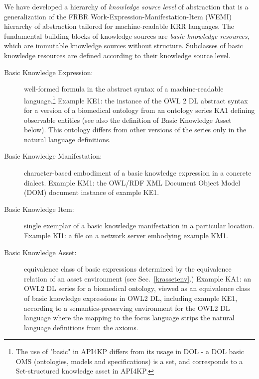 \documentclass[runningheads]{llncs}
\begin{document}
We have developed a hierarchy of \emph{knowledge source level} of abstraction that is a generalization of the FRBR \cite{FRBR} Work-Expression-Manifestation-Item (WEMI) hierarchy of abstraction tailored for machine-readable KRR languages. The fundamental building blocks of knowledge sources are \emph{basic knowledge resources}, which are immutable knowledge sources without structure.
Subclasses of basic knowledge resources are defined according to their knowledge source level. 
\begin{description}
\item[Basic Knowledge Expression:] well-formed formula in the abstract syntax of a machine-readable language.\footnote{The use of "basic" in API4KP differs from its usage in DOL - a DOL basic OMS  (ontologies, models and specifications) is a set, and corresponds to a Set-structured knowledge asset in API4KP.}
Example KE1: the instance of the OWL 2 DL abstract syntax for a version of a biomedical ontology from an ontology series KA1 
defining observable entities
(see also the definition of Basic Knowledge Asset below). 
This ontology differs from other versions of the series only in the natural language definitions.
\item[Basic Knowledge Manifestation:] character-based embodiment of a basic knowledge expression in a concrete dialect. Example KM1: the OWL/RDF XML Document Object Model (DOM) document instance of example KE1.
\item[Basic Knowledge Item:] single exemplar of a basic knowledge manifestation in a particular location. Example KI1: a file on a network server embodying example KM1.
\item[Basic Knowledge Asset:] equivalence class of basic expressions determined by the equivalence relation of an asset environment (see Sec.~\ref{krassetenv}.) Example KA1: an OWL2 DL series for a biomedical ontology, viewed as an equivalence class of basic knowledge expressions in OWL2 DL, including example KE1, according to a semantics-preserving environment for the OWL2 DL language where the mapping to the focus language strips the natural language definitions from the axioms.
\end{description}
\end{document}
